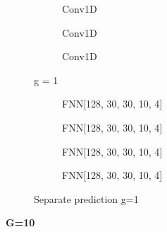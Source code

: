 \documentclass[a4paper,times,12pt]{article}
\begin{document}
\begin{figure}[H]
    \centering
    \begin{subfigure}[t]{0.45\textwidth}
		\centering
        
        \caption{Conv1D}
		\label{fig:a}
    \end{subfigure}\hfill
    \begin{subfigure}[t]{0.45\textwidth}
		\centering
        
        \caption{Conv1D}
		\label{fig:b}
    \end{subfigure}\hfill    
    \begin{subfigure}[t]{0.45\textwidth}
        \centering
        
        \caption{Conv1D}
		\label{fig:c}
    \end{subfigure}
	\caption{g = 1}
\end{figure}

\begin{figure}[H]
    \centering
    \begin{subfigure}[t]{0.45\textwidth}
		\centering
        
        \caption{FNN[128, 30, 30, 10, 4]}
		\label{fig:a}
    \end{subfigure}\hfill
    \begin{subfigure}[t]{0.45\textwidth}
		\centering
        
        \caption{FNN[128, 30, 30, 10, 4]}
		\label{fig:b}
    \end{subfigure}\hfill    
    \begin{subfigure}[t]{0.45\textwidth}
        \centering
        
        \caption{FNN[128, 30, 30, 10, 4]}
		\label{fig:c}
    \end{subfigure}\hfill
    \begin{subfigure}[t]{0.45\textwidth}
        \centering
        
        \caption{FNN[128, 30, 30, 10, 4]}
		\label{fig:c}
    \end{subfigure}
	\caption{Separate prediction  g=1}
\end{figure}

\textbf{G=10}
\end{document}
